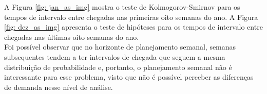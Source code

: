 A Figura \ref*{fig: jan_as_img} mostra o teste de Kolmogorov-Smirnov para os tempos de intervalo entre chegadas nas primeiras oito semanas do ano. A Figura \ref*{fig: dez_as_img} apresenta o teste de hipóteses para os tempos de intervalo entre chegadas nas últimas oito semanas do ano.\\
Foi possível observar que no horizonte de planejamento semanal, semanas subsequentes tendem a ter intervalos de chegada que seguem a mesma distribuição de probabilidade e, portanto, o planejamento semanal não é interessante para esse problema, visto que não é possível perceber as diferenças de demanda nesse nível de análise.